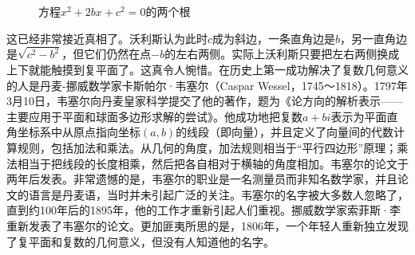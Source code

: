 \documentclass[b5paper]{ctexart}
\begin{document}
\begin{figure}[htbp]
  \centering
  \caption{方程$x^2 + 2bx + c^2 = 0$的两个根}
\end{figure}

这已经非常接近真相了。沃利斯认为此时$c$成为斜边，一条直角边是$b$，另一直角边是$\sqrt{c^2 - b^2}$，但它们仍然在点$-b$的左右两侧。实际上沃利斯只要把左右两侧换成上下就能触摸到复平面了。这真令人惋惜。在历史上第一成功解决了复数几何意义的人是丹麦-挪威数学家卡斯帕尔·韦塞尔（Caspar Wessel，1745～1818）。1797年3月10日，韦塞尔向丹麦皇家科学提交了他的著作，题为《论方向的解析表示——主要应用于平面和球面多边形求解的尝试》。他成功地把复数$a + bi$表示为平面直角坐标系中从原点指向坐标$(a, b)$的线段（即向量），并且定义了向量间的代数计算规则，包括加法和乘法。从几何的角度，加法规则相当于“平行四边形”原理；乘法相当于把线段的长度相乘，然后把各自相对于横轴的角度相加。韦塞尔的论文于两年后发表。非常遗憾的是，韦塞尔的职业是一名测量员而非知名数学家，并且论文的语言是丹麦语，当时并未引起广泛的关注。韦塞尔的名字被大多数人忽略了，直到约100年后的1895年，他的工作才重新引起人们重视。挪威数学家索菲斯·李重新发表了韦塞尔的论文。更加匪夷所思的是，1806年，一个年轻人重新独立发现了复平面和复数的几何意义，但没有人知道他的名字。
\end{document}
